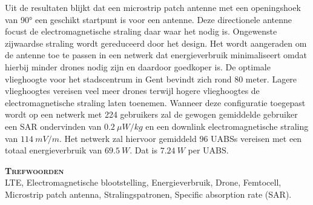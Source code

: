 Uit de resultaten blijkt dat een microstrip patch antenne
met een openingshoek van \ang{90} een geschikt startpunt is voor een antenne.
Deze directionele  antenne focust de electromagnetische straling daar waar het nodig is.
Ongewenste zijwaardse straling wordt gereduceerd door het design.
Het wordt aangeraden om de antenne toe te passen in een netwerk dat energieverbruik minimaliseert
omdat hierbij minder drones nodig zijn en daardoor goedkoper is.
De optimale vlieghoogte voor het stadscentrum in Gent bevindt zich rond 80  meter.
Lagere vlieghoogtes vereisen veel meer drones terwijl hogere vlieghoogtes de 
electromagnetische straling laten toenemen.
Wanneer deze configuratie toegepast wordt op een netwerk met 224 gebruikers zal de gewogen gemiddelde gebruiker 
een SAR ondervinden van  $0.2\ \mu W/kg$ en een downlink electromagnetische straling van 
$114\ mV/m$. Het netwerk zal hiervoor gemiddeld 96 UABSs vereisen met een totaal energieverbruik 
van $69.5\ W$. Dat is $7.24\ W$ per UABS.

\textsc{\textbf{\LARGE Trefwoorden}}\\
LTE, Electromagnetische blootstelling, 
Energieverbruik, Drone,
Femtocell, Microstrip patch antenna, Stralingspatronen, Specific absorption rate (SAR).

